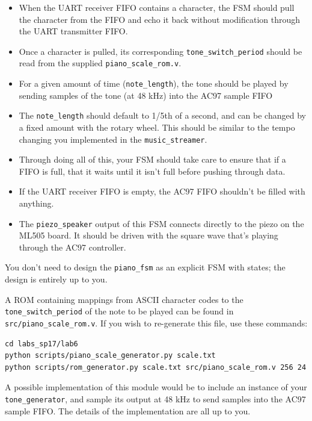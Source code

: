 \documentclass[11pt]{article}
\begin{document}
\begin{itemize}
	\item When the UART receiver FIFO contains a character, the FSM should pull the character from the FIFO and echo it back without modification through the UART transmitter FIFO.
	
	\item Once a character is pulled, its corresponding \verb|tone_switch_period| should be read from the supplied \verb|piano_scale_rom.v|.
	
	\item For a given amount of time (\verb|note_length|), the tone should be played by sending samples of the tone (at 48 kHz) into the AC97 sample FIFO
	
	\item The \verb|note_length| should default to 1/5th of a second, and can be changed by a fixed amount with the rotary wheel. This should be similar to the tempo changing you implemented in the \verb|music_streamer|.
	
	\item Through doing all of this, your FSM should take care to ensure that if a FIFO is full, that it waits until it isn't full before pushing through data.
	
	\item If the UART receiver FIFO is empty, the AC97 FIFO shouldn't be filled with anything.
	
	\item The \verb|piezo_speaker| output of this FSM connects directly to the piezo on the ML505 board. It should be driven with the square wave that's playing through the AC97 controller.
\end{itemize}

You don't need to design the \verb|piano_fsm| as an explicit FSM with states; the design is entirely up to you.

A ROM containing mappings from ASCII character codes to the \verb|tone_switch_period| of the note to be played can be found in \verb|src/piano_scale_rom.v|. If you wish to re-generate this file, use these commands:

\begin{verbatim}
cd labs_sp17/lab6
python scripts/piano_scale_generator.py scale.txt
python scripts/rom_generator.py scale.txt src/piano_scale_rom.v 256 24
\end{verbatim}

A possible implementation of this module would be to include an instance of your \verb|tone_generator|, and sample its output at 48 kHz to send samples into the AC97 sample FIFO. The details of the implementation are all up to you.
\end{document}
